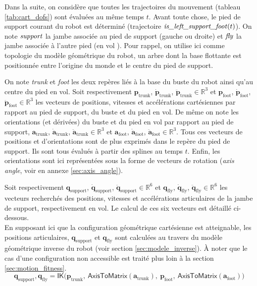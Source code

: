 Dans la suite, on considère que toutes les trajectoires du mouvement
(tableau \ref{tab:cart_dofs}) sont évaluées au même temps $t$.
Avant toute chose, le pied de support courant du robot est déterminé 
(trajectoire $\text{\textit{is\_left\_support\_foot}}(t)$).
On note $\text{\textit{support}}$ la jambe associée au pied de support (gauche ou droite)
et $\text{\textit{fly}}$ la jambe associée à l'autre pied (\og en vol \fg).
Pour rappel, on utilise ici comme topologie du  modèle géométrique du robot, 
un arbre dont la base flottante est positionnée entre l'origine du
monde et le centre du pied de support.

On note \textit{trunk} et \textit{foot} les deux repères liés
à la base du buste du robot ainsi qu'au centre du pied en vol.
Soit respectivement
$\bm{p}_{\text{trunk}}$, $\bm{\dot{p}}_{\text{trunk}}$, $\bm{\ddot{p}}_{\text{trunk}} \in \mathbb{R}^3$ et
$\bm{p}_{\text{foot}}$, $\bm{\dot{p}}_{\text{foot}}$, $\bm{\ddot{p}}_{\text{foot}} \in \mathbb{R}^3$
les vecteurs de positions, vitesses et accélérations cartésiennes par rapport au pied de support,
du buste et du pied en vol.
De même on note les orientations (et dérivées) du buste et du pied en vol par rapport
au pied de support,
$\bm{a}_{\text{trunk}}$, $\bm{\dot{a}}_{\text{trunk}}$, $\bm{\ddot{a}}_{\text{trunk}} \in \mathbb{R}^3$ et
$\bm{a}_{\text{foot}}$, $\bm{\dot{a}}_{\text{foot}}$, $\bm{\ddot{a}}_{\text{foot}} \in \mathbb{R}^3$.
Tous ces vecteurs de positions et d'orientations sont de plus exprimés dans le repère du pied de support.
Ils sont tous évalués à partir des splines au temps $t$.
Enfin, les orientations sont ici représentées sous la forme de vecteurs 
de rotation (\textit{axis angle}, voir en annexe \ref{sec:axis_angle}).

Soit respectivement $\bm{q}_{\text{support}}$, $\bm{\dot{q}}_{\text{support}}$, 
$\bm{\ddot{q}}_{\text{support}} \in \mathbb{R}^6$ et $\bm{q}_{\text{fly}}$, 
$\bm{\dot{q}}_{\text{fly}}$, $\bm{\ddot{q}}_{\text{fly}} \in \mathbb{R}^6$ 
les vecteurs recherchés des positions, vitesses et accélérations articulaires de la jambe
de support, respectivement en vol. 
Le calcul de ces six vecteurs est détaillé ci-dessous.\\

En supposant ici que la configuration géométrique cartésienne est atteignable,
les positions articulaires, $\bm{q}_{\text{support}}$ et $\bm{q}_{\text{fly}}$
sont calculées au travers du modèle géométrique inverse du robot 
(voir section \ref{sec:modele_inverse}).
À noter que le cas d'une configuration non accessible est traité 
plus loin à la section \ref{sec:motion_fitness}.
$$
\bm{q}_{\text{support}}, \bm{q}_{\text{fly}} = \mathsf{IK}
\Big(
    \bm{p}_{\text{trunk}},~
    \mathsf{AxisToMatrix}(\bm{a}_{\text{trunk}}),~
    \bm{p}_{\text{foot}},~
    \mathsf{AxisToMatrix}(\bm{a}_{\text{foot}})
\Big)
$$

